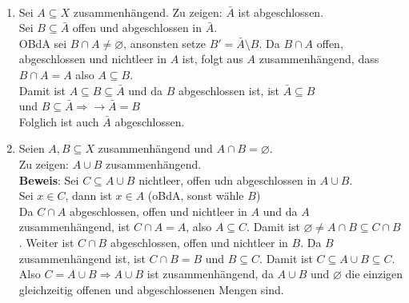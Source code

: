 \begin{solution}
  \
  \begin{enumerate}[label=(\alph*)]
    \item Sei \( A \subseteq X \) zusammenhängend. Zu zeigen: \( \bar{A} \) ist abgeschlossen. \\ 
    Sei \( B \subseteq \bar{A} \) offen und abgeschlossen in \( \bar{A} \). \\
    OBdA sei \( B \cap A \neq \varnothing \), ansonsten setze \( B' = \bar{A} \setminus B \).
    Da \( B \cap A \) offen, abgeschlossen und nichtleer in \( A \) ist, folgt aus \( A \) zusammenhängend, dass 
    \( B \cap A = A \) also \( A \subseteq B \). \\
    Damit ist \( A \subseteq B \subseteq \bar{A} \) und da \( B \) abgeschlossen ist, ist \( \bar{A} \subseteq B \) \\
    und \( B \subseteq \bar{A} \Rightarrow \rightarrow \bar{A} = B \) \\
    Folglich ist auch \( \bar{A} \) abgeschlossen.

    \item Seien \( A,B \subseteq X \) zusammenhängend und \( A \cap B = \varnothing \). \\
    Zu zeigen: \( A \cup B \) zusammenhängend. \\
    \textbf{Beweis}: Sei \( C \subseteq A \cup B \) nichtleer, offen udn abgeschlossen in \( A \cup B \). \\
    Sei \( x \in C \), dann ist \( x \in A \) (oBdA, sonst wähle \( B \))\\
    Da \( C \cap A \) abgeschlossen, offen und nichtleer in \( A \) und da \( A \) zusammenhängend, ist \( C \cap A = A \), also \( A \subseteq C \). Damit ist \( \varnothing \neq A \cap B \subseteq C \cap B \). Weiter ist \( C \cap B \) abgeschlossen, offen und nichtleer in \( B \). Da \( B \) zusammenhängend ist, ist \( C \cap B = B \) und \( B \subseteq C \). Damit ist \( C \subseteq A \cup B \subseteq C \). \\
    Also \( C = A \cup B \Rightarrow A \cup B \) ist zusammenhängend, da \( A \cup B \) und \( \varnothing \) die einzigen gleichzeitig offenen und abgeschlossenen Mengen sind. 


\end{enumerate}
\end{solution}
